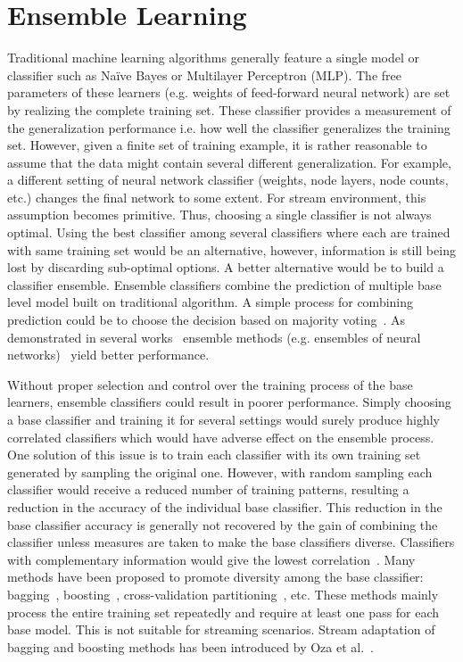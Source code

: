 
\section{Ensemble Learning}
Traditional machine learning algorithms generally feature a single model or classifier such as Na\"ive Bayes or Multilayer Perceptron (MLP). The free parameters of these learners (e.g. weights of feed-forward neural network) are set by realizing the complete training set. These classifier provides a measurement of the generalization performance i.e. how well the classifier generalizes the training set. However, given a finite set of training example, it is rather reasonable to assume that the data might contain several different generalization. For example, a different setting of neural network classifier (weights, node layers, node counts, etc.) changes the final network to some extent. For stream environment, this assumption becomes primitive. Thus, choosing a single classifier is not always optimal. Using the best classifier among several classifiers where each are trained with same training set would be an alternative, however, information is still being lost by discarding sub-optimal options. A better alternative would be to build a classifier ensemble. Ensemble classifiers combine the prediction of multiple base level model built on traditional algorithm. A simple process for combining prediction could be to choose the decision based on majority voting~\cite{parhami94:voting}. As demonstrated in several works~\cite{breiman93:regression, schapire90:whyens, wolpert92:whyens} ensemble methods (e.g. ensembles of neural networks)~\cite{hansen90:ensNN, tumer99:whyens} yield better performance. 

Without proper selection and control over the training process of the base learners, ensemble classifiers could result in poorer performance. Simply choosing a base classifier and training it for several settings would surely produce highly correlated classifiers which would have adverse effect on the ensemble process. One solution of this issue is to train each classifier with its own training set generated by sampling the original one. However, with random sampling each classifier would receive a reduced number of training patterns, resulting a reduction in the accuracy of the individual base classifier. This reduction in the base classifier accuracy is generally not recovered by the gain of combining the classifier unless measures are taken to make the base classifiers diverse. Classifiers with complementary information would give the lowest correlation~\cite{breiman93:regression, tumer99:whyens}. Many methods have been proposed to promote diversity among the base classifier: bagging~\cite{breiman94:bagging}, boosting~\cite{drucker94:boosting, freund97:boosting, oza99:whyens}, cross-validation partitioning~\cite{krogh95:ensNNcv, tumer99:whyens}, etc. These methods mainly process the entire training set repeatedly and require at least one pass for each base model. This is not suitable for streaming scenarios. Stream adaptation of bagging and boosting methods has been introduced by Oza et al.~\cite{oza01:obagboost,oza01:thesis}.

